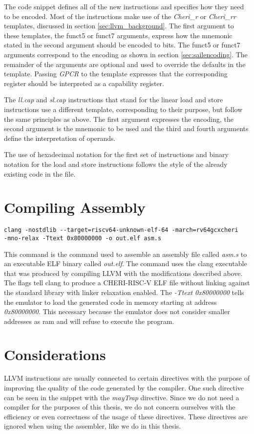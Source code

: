 The code snippet defines all of the new instructions and specifies how they need to be encoded. Most of the instructions make use of the \textit{Cheri\_r} or \textit{Cheri\_rr} templates, discussed in section \ref{sec:llvm_background}.
The first argument to these templates, the funct5 or funct7 arguments, express how the mnemonic stated in the second argument should be encoded to bits. The funct5 or funct7 arguments correspond to the encoding as shown in section \ref{sec:sailencoding}. The remainder of the arguments are optional and used to override the defaults in the template. Passing \textit{GPCR} to the template expresses that the corresponding register should be interpreted as a capability register.

The \textit{ll.cap} and \textit{sl.cap} instructions that stand for the linear load and store instructions use a different template, corresponding to their purpose, but follow the same principles as above. The first argument expresses the encoding, the second argument is the mnemonic to be used and the third and fourth arguments define the interpretation of operands.

The use of hexadecimal notation for the first set of instructions and binary notation for the load and store instructions follows the style of the already existing code in the file.

\section{Compiling Assembly}
\begin{verbatim}
clang -nostdlib --target=riscv64-unknown-elf-64 -march=rv64gcxcheri
-mno-relax -Ttext 0x80000000 -o out.elf asm.s
\end{verbatim}
This command is the command used to assemble an assembly file called \textit{asm.s} to an executable ELF binary called \textit{out.elf}. The command uses the clang executable that was produced by compiling LLVM with the modifications described above. The flags tell clang to produce a CHERI-RISC-V ELF file without linking against the standard library with linker relaxation enabled. The \textit{-Ttext 0x80000000} tells the emulator to load the generated code in memory starting at address \textit{0x80000000}. This necessary because the emulator does not consider smaller addresses as ram and will refuse to execute the program.

\section{Considerations}
LLVM instructions are usually connected to certain directives with the purpose of improving the quality of the code generated by the compiler. One such directive can be seen in the snippet with the \textit{mayTrap} directive. Since we do not need a compiler for the purposes of this thesis, we do not concern ourselves with the efficiency or even correctness of the usage of these directives. These directives are ignored when using the assembler, like we do in this thesis.
